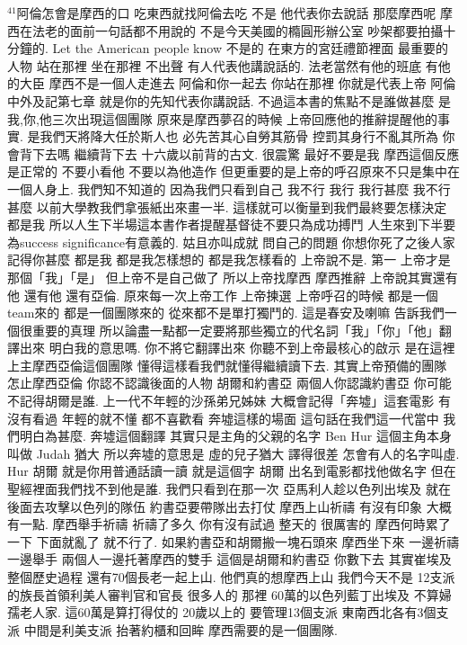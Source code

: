 \documentclass{book}
\begin{document}
$^{41}$阿倫怎會是摩西的口 吃東西就找阿倫去吃 不是 他代表你去說話 那麼摩西呢 摩西在法老的面前一句話都不用說的 不是今天美國的橢圓形辦公室 吵架都要拍攝十分鐘的.
Let the American people know 不是的 在東方的宮廷禮節裡面 最重要的人物 站在那裡 坐在那裡 不出聲 有人代表他講說話的.
法老當然有他的班底 有他的大臣 摩西不是一個人走進去 阿倫和你一起去 你站在那裡 你就是代表上帝 阿倫 中外及記第七章 就是你的先知代表你講說話.
不過這本書的焦點不是誰做甚麼 是我,你,他三次出現這個團隊 原來是摩西夢召的時候 上帝回應他的推辭提醒他的事實.
是我們天將降大任於斯人也 必先苦其心自勞其筋骨 控罰其身行不亂其所為 你會背下去嗎 繼續背下去 十六歲以前背的古文.
很震驚 最好不要是我 摩西這個反應是正常的 不要小看他 不要以為他造作 但更重要的是上帝的呼召原來不只是集中在一個人身上.
我們知不知道的 因為我們只看到自己 我不行 我行 我行甚麼 我不行甚麼 以前大學教我們拿張紙出來畫一半.
這樣就可以衡量到我們最終要怎樣決定 都是我 所以人生下半場這本書作者提醒基督徒不要只為成功搏鬥 人生來到下半要為success significance有意義的.
姑且亦叫成就 問自己的問題 你想你死了之後人家記得你甚麼 都是我 都是我怎樣想的 都是我怎樣看的 上帝說不是.
第一 上帝才是那個「我」「是」 但上帝不是自己做了 所以上帝找摩西 摩西推辭 上帝說其實還有他 還有他 還有亞倫.
原來每一次上帝工作 上帝揀選 上帝呼召的時候 都是一個team來的 都是一個團隊來的 從來都不是單打獨鬥的.
這是春安及喇嘛 告訴我們一個很重要的真理 所以論盡一點都一定要將那些獨立的代名詞「我」「你」「他」翻譯出來 明白我的意思嗎.
你不將它翻譯出來 你聽不到上帝最核心的啟示 是在這裡 上主摩西亞倫這個團隊 懂得這樣看我們就懂得繼續讀下去.
其實上帝預備的團隊 怎止摩西亞倫 你認不認識後面的人物 胡爾和約書亞 兩個人你認識約書亞 你可能不記得胡爾是誰.
上一代不年輕的沙孫弟兄姊妹 大概會記得「奔墟」這套電影 有沒有看過 年輕的就不懂 都不喜歡看 奔墟這樣的場面 這句話在我們這一代當中 我們明白為甚麼.
奔墟這個翻譯 其實只是主角的父親的名字 Ben Hur 這個主角本身叫做 Judah 猶大 所以奔墟的意思是 虛的兒子猶大 譯得很差 怎會有人的名字叫虛.
Hur 胡爾 就是你用普通話讀一讀 就是這個字 胡爾 出名到電影都找他做名字 但在聖經裡面我們找不到他是誰.
我們只看到在那一次 亞馬利人趁以色列出埃及 就在後面去攻擊以色列的隊伍 約書亞要帶隊出去打仗 摩西上山祈禱 有沒有印象 大概有一點.
摩西舉手祈禱 祈禱了多久 你有沒有試過 整天的 很厲害的 摩西何時累了一下 下面就亂了 就不行了.
如果約書亞和胡爾搬一塊石頭來 摩西坐下來 一邊祈禱 一邊舉手 兩個人一邊托著摩西的雙手 這個是胡爾和約書亞 你數下去 其實崔埃及整個歷史過程 還有70個長老一起上山.
他們真的想摩西上山 我們今天不是 12支派的族長首領利美人審判官和官長 很多人的 那裡 60萬的以色列藍丁出埃及 不算婦孺老人家.
這60萬是算打得仗的 20歲以上的 要管理13個支派 東南西北各有3個支派 中間是利美支派 抬著約櫃和回眸 摩西需要的是一個團隊.
\end{document}
